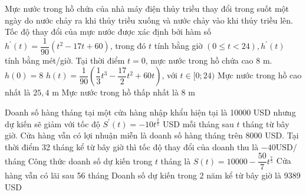 \begin{ex}
	Mực nước trong hồ chứa của nhà máy điện thủy triều thay đổi trong suốt một ngày do nước chảy ra khi thủy triều xuống và nước chảy vào khi thủy triều lên. Tốc độ thay đổi của mực nước được xác định bởi hàm số $h^{\prime}(t)=\dfrac{1}{90}\left(t^2-17 t+60\right)$, trong đó $t$ tính bằng giờ $(0 \leq t <24), h^{\prime}(t)$ tính bằng mét/giờ. Tại thời điểm $t=0$, mực nước trong hồ chứa cao 8 m.
	\choiceTF
	{\True $h(0)=8$}
	{$h(t)=\dfrac{1}{90}\left(\dfrac{1}{3} t^3-\dfrac{17}{2} t^2+60 t\right)$, với $t \in [0;24)$}
	{Mực nước trong hồ cao nhất là $25,4$ m}
	{\True Mực nước trong hồ thấp nhất là $8$ m}
\end{ex}
 \begin{ex}
 Doanh số hàng tháng tại một cửa hàng nhập khẩu hiện tại là 10000 USD nhưng dự kiến sẽ giảm với tốc độ $S^{\prime}(t)=-10 t^{\frac{2}{5}}$ USD mỗi tháng sau $t$ tháng từ bây giờ. Cửa hàng vẫn có lợi nhuận miễn là doanh số hàng tháng trên 8000 USD.
 	\choiceTF
 	{\True Tại thời điểm 32 tháng kể từ bây giờ thì tốc độ thay đổi của doanh thu là $-40 \mathrm{USD} /$ tháng}
 	{\True Công thức doanh số dự kiến trong $t$ tháng là $S(t)=10000-\dfrac{50}{7} t^{\frac{7}{5}}$}
 	{Cửa hàng vẫn có lãi sau 56 tháng}
 	{\True Doanh số dự kiến trong 2 năm kể từ bây giờ là 9389 USD}
 \end{ex}
